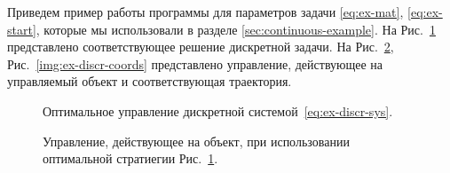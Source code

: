 Приведем пример работы программы для параметров задачи \eqref{eq:ex-mat}, \eqref{eq:ex-start}, которые мы использовали в разделе \ref{sec:continuous-example}. На Рис.~\ref{img:discr-control} представлено соответствующее решение дискретной задачи. На Рис.~\ref{img:control}, Рис.~\ref{img:ex-discr-coords} представлено управление, действующее на управляемый объект и соответствующая траектория.

\begin{figure}[bh]
        \noindent{}
        \caption{Оптимальное управление дискретной системой~\eqref{eq:ex-discr-sys}.}
        \label{img:discr-control}
\end{figure}
\begin{figure}[bh]
        \noindent{}
        \caption{Управление, действующее на объект, при использовании оптимальной стратиегии Рис.~\ref{img:discr-control}.}
        \label{img:control}
\end{figure}
